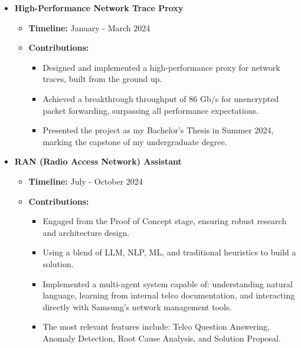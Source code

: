 \begin{itemize}
    \item \textbf{High-Performance Network Trace Proxy}
    \begin{itemize}
        \item \textbf{Timeline:} January - March 2024
        \item \textbf{Contributions:}
        \begin{itemize}
            \item Designed and implemented a high-performance proxy for network traces, built from the ground up.
            \item Achieved a breakthrough throughput of 86 Gb/s for unencrypted packet forwarding, surpassing all performance expectations.
            \item Presented the project as my Bachelor's Thesis in Summer 2024, marking the capstone of my undergraduate degree.
        \end{itemize}
    \end{itemize}
    
    \item \textbf{RAN (Radio Access Network) Assistant}
    \begin{itemize}
        \item \textbf{Timeline:} July - October 2024
        \item \textbf{Contributions:}
        \begin{itemize}
            \item Engaged from the Proof of Concept stage, ensuring robust research and architecture design.
            \item Using a blend of LLM, NLP, ML, and traditional heuristics to build a solution.
            \item Implemented a multi-agent system capable of: understanding natural language, learning from internal telco documentation, and interacting directly with Samsung's network management tools.
            \item The most relevant features include: Telco Question Answering, Anomaly Detection, Root Cause Analysis, and Solution Proposal. 
        \end{itemize}
    \end{itemize}
\end{itemize}


